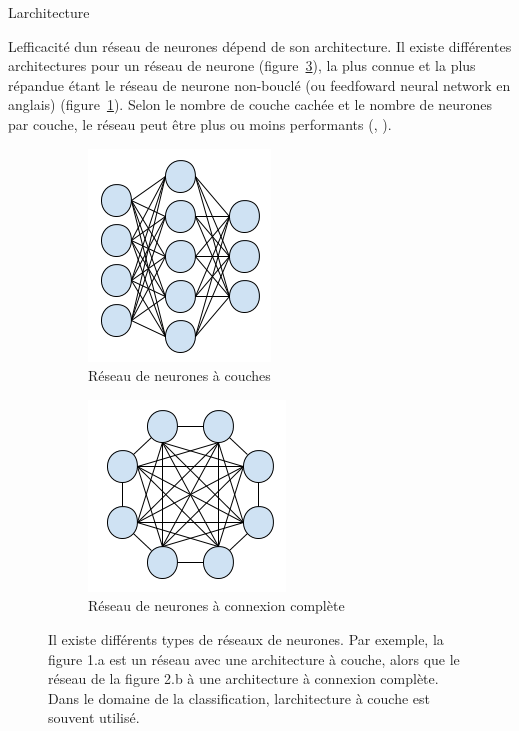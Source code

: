 \documentclass[11pt]{sdm}
\begin{document}
			\medbreak
			\begin{itshape}L\textquotesingle architecture\end{itshape}
			\smallbreak
			L\textquotesingle efficacit\'e d\textquotesingle un r\'eseau de neurones d\'epend de son architecture.
			Il existe diff\'erentes architectures pour un r\'eseau de neurone (figure~\ref{fig:neuralNetwork}), la plus connue et la plus r\'epandue \'etant le r\'eseau de neurone non-boucl\'e (ou feedfoward neural network en anglais) (figure~\ref{fig:nnl}). Selon le nombre de couche cach\'ee et le nombre de neurones par couche, le r\'eseau peut \^etre plus ou moins performants (\cite{chatfield2014return}, \cite{srivastava2014dropout}). 

			\begin{figure}[!ht]
				\centering
				\begin{subfigure}{0.45\textwidth}
					\centering	
					\includegraphics[scale=0.7,natwidth=183,natheight=213]{figures/neuralNetworkLayers.png}
					\caption{R\'eseau de neurones \`a couches}
					\label{fig:nnl}
				\end{subfigure}
				\hspace*{\fill}
				\begin{subfigure}{0.45\textwidth}	
					\centering
					\includegraphics[scale=0.7,natwidth=198,natheight=192]{figures/neuralNetworkCompleteConnexion.png}
					\caption{R\'eseau de neurones \`a connexion compl\`ete}
					\label{fig:nnc}
				\end{subfigure}
				\caption{Il existe diff\'erents types de r\'eseaux de neurones. Par exemple, la figure 1.a est un r\'eseau avec une architecture \`a couche, alors que le r\'eseau de la figure 2.b \`a une architecture \`a connexion compl\`ete. Dans le domaine de la classification, l\textquotesingle architecture \`a couche est souvent utilis\'e.}
				\label{fig:neuralNetwork}
			\end{figure}
			
\end{document}
